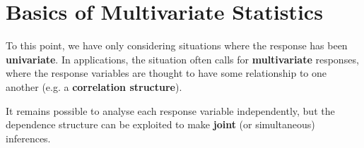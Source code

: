 
\section{Basics of Multivariate Statistics}\label{sec: Multi.Stat}
To this point, we have only considering situations where the response has been \textbf{univariate}. In applications, the situation often calls for \textbf{multivariate} responses,  where the response variables are thought to have some relationship to one another (e.g. a \textbf{correlation structure}). \par It remains possible to analyse each response variable independently, but the dependence structure can be exploited to make \textbf{joint} (or simultaneous) inferences.

